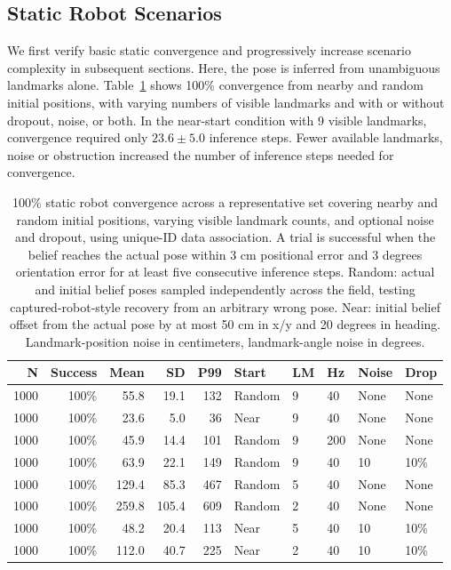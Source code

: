 \subsection{Static Robot Scenarios}
\label{subsec:experiments-static}

We first verify basic static convergence and progressively increase scenario complexity in subsequent sections. Here, the pose is inferred from unambiguous landmarks alone.
Table~\ref{tab:static-convergence-results} shows 100\% convergence from nearby and random initial positions, with varying numbers of visible landmarks and with or without dropout, noise, or both. In the near-start condition with 9 visible landmarks, convergence required only $23.6 \pm 5.0$ inference steps. Fewer available landmarks, noise or obstruction increased the number of inference steps needed for convergence.

\begin{table}[!htbp]
    \centering
    \caption{\scriptsize 100\% static robot convergence across a representative set covering nearby and random initial positions, varying visible landmark counts, and optional noise and dropout, using unique-ID data association. A trial is successful when the belief reaches the actual pose within 3 cm positional error and 3 degrees orientation error for at least five consecutive inference steps. Random: actual and initial belief poses sampled independently across the field, testing captured-robot-style recovery from an arbitrary wrong pose. Near: initial belief offset from the actual pose by at most 50 cm in x/y and 20 degrees in heading. Landmark-position noise in centimeters, landmark-angle noise in degrees.}
    \label{tab:static-convergence-results}
    \scriptsize
    \begin{tabular}{rrrrrlllll}
        \toprule
        N & Success & Mean & SD & P99 & Start & LM & Hz & Noise & Drop \\
        \midrule
        1000 & 100\% & 55.8 & 19.1 & 132 & Random & 9 & 40 & None & None \\
        1000 & 100\% & 23.6 & 5.0 & 36 & Near & 9 & 40 & None & None \\
        1000 & 100\% & 45.9 & 14.4 & 101 & Random & 9 & 200 & None & None \\
        1000 & 100\% & 63.9 & 22.1 & 149 & Random & 9 & 40 & 10 & 10\% \\
        1000 & 100\% & 129.4 & 85.3 & 467 & Random & 5 & 40 & None & None \\
        1000 & 100\% & 259.8 & 105.4 & 609 & Random & 2 & 40 & None & None \\
        1000 & 100\% & 48.2 & 20.4 & 113 & Near & 5 & 40 & 10 & 10\% \\
        1000 & 100\% & 112.0 & 40.7 & 225 & Near & 2 & 40 & 10 & 10\% \\
        \bottomrule
    \end{tabular}
\end{table}

